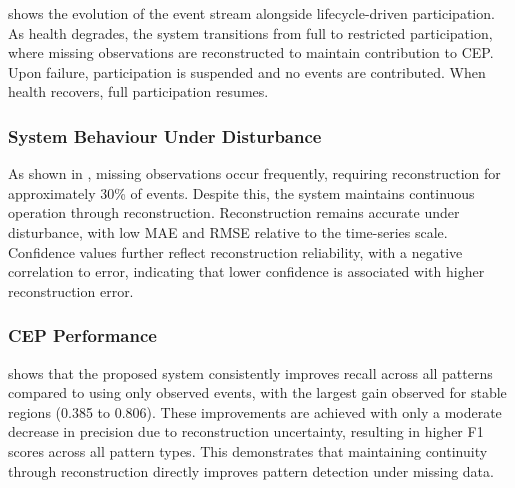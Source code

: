  shows the evolution of the event stream alongside lifecycle-driven participation. As health degrades, the system transitions from full to restricted participation, where missing observations are reconstructed to maintain contribution to CEP. Upon failure, participation is suspended and no events are contributed. When health recovers, full participation resumes.

\subsubsection{System Behaviour Under Disturbance}



As shown in , missing observations occur frequently, requiring reconstruction for approximately 30\% of events. Despite this, the system maintains continuous operation through reconstruction. Reconstruction remains accurate under disturbance, with low MAE and RMSE relative to the time-series scale. Confidence values further reflect reconstruction reliability, with a negative correlation to error, indicating that lower confidence is associated with higher reconstruction error.

\subsubsection{CEP Performance}



 shows that the proposed system consistently improves recall across all patterns compared to using only observed events, with the largest gain observed for stable regions (0.385 to 0.806). These improvements are achieved with only a moderate decrease in precision due to reconstruction uncertainty, resulting in higher F1 scores across all pattern types. This demonstrates that maintaining continuity through reconstruction directly improves pattern detection under missing data.